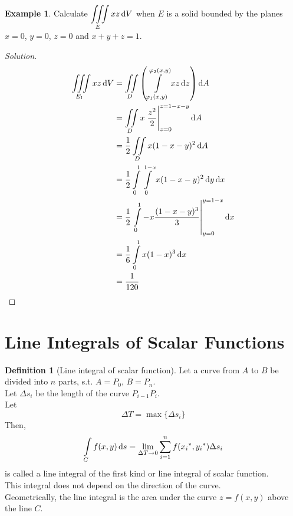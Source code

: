 \documentclass[fleqn, a4paper, 12pt]{article}
\theoremstyle{definition}
\newtheorem{example}{Example}
\newtheorem{definition}{Definition}
\theoremstyle{theorem}
\theoremstyle{remark}
\newenvironment{solution}
{\begin{proof}[Solution]\let\qed\relax}
	{\end{proof}}
\begin{document}
\begin{example}
	Calculate $\displaystyle \iiint\limits_{E} x z \dif V$ when $E$ is a solid bounded by the planes $x = 0$, $y = 0$, $z = 0$ and $x + y + z = 1$.
\end{example}

\begin{solution}
	\begin{align*}
		\iiint\limits_{E_{\textnormal{I}}} x z \dif V &= \iint\limits_{D} \left( \int\limits_{\varphi_1(x,y)}^{\varphi_2(x,y)} x z \dif z \right) \dif A\\
		&= \iint\limits_{D} x \left. \dfrac{z^2}{2} \right\rvert_{z = 0}^{z = 1 - x - y} \dif A\\
		&= \dfrac{1}{2} \iint\limits_{D} x (1 - x - y)^2 \dif A\\
		&= \dfrac{1}{2} \int\limits_{0}^{1} \int\limits_{0}^{1 - x} x (1 - x - y)^2 \dif y \dif x\\
		&= \dfrac{1}{2} \left. \int\limits_{0}^{1} -x \dfrac{(1 - x - y)^3}{3} \right\rvert_{y = 0}^{y = 1 - x} \dif x \\
		&= \dfrac{1}{6} \int\limits_{0}^{1} x (1 - x)^3 \dif x\\
		&= \dfrac{1}{120}
	\end{align*}
\end{solution}

\section{Line Integrals of Scalar Functions}

\begin{definition}[Line integral of scalar function]
	Let a curve from $A$ to $B$ be divided into $n$ parts, s.t. $A = P_0$, $B = P_n$.\\
	Let $\Delta s_i$ be the length of the curve $P_{i - 1} P_i$.\\
	Let 
	\begin{equation*}
		\Delta T = \max \{\Delta s_i\}
	\end{equation*}
	Then, 
	\begin{equation*}
		\int\limits_{C} f(x,y) \dif s = \lim\limits_{\Delta T \to 0} \sum_{i = 1}^{n} f({x_i}^*, {y_i}^*) \Delta s_i
	\end{equation*}
	is called a line integral of the first kind or line integral of scalar function.\\
	This integral does not depend on the direction of the curve.\\
	Geometrically, the line integral is the area under the curve $z = f(x,y)$ above the line $C$.
\end{definition}	
\end{document}

